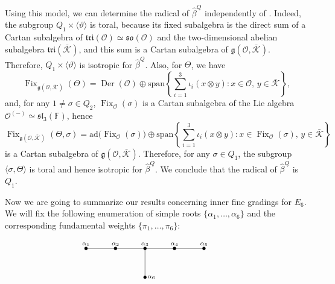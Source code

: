 \documentclass[a4paper,reqno]{amsart}
\theoremstyle{definition}
\numberwithin{theorem}{section}
\numberwithin{equation}{section}
\begin{document}
Using this model, we can determine the radical of $\hat{\beta}^Q$ independently of \cite{DV_E6}. Indeed, the subgroup $Q_1\times\langle\vartheta\rangle$ is toral, because its fixed subalgebra is the direct sum of a Cartan subalgebra of ${\mathfrak{tri}}({\mathcal{O}})\simeq{{\mathfrak{so}}}({\mathcal{O}})$ and the two-dimensional abelian subalgebra ${\mathfrak{tri}}(\bar{\mathcal{K}})$, and this sum is a Cartan subalgebra of ${{\mathfrak g}}({\mathcal{O}},\bar{\mathcal{K}})$. Therefore, $Q_1\times\langle\vartheta\rangle$ is isotropic for $\hat\beta^Q$. Also, for $\Theta$, we have  
\[
\operatorname{\mathrm{Fix}}_{{{\mathfrak g}}({\mathcal{O}},\bar{\mathcal{K}})}(\Theta)=\operatorname{\mathrm{Der}}({\mathcal{O}})\oplus{\mathrm{span}\left\{{\sum_{i=1}^3\iota_i(x\otimes y):  x\in{\mathcal{O}},\,y\in\bar{\mathcal{K}}}\right\}},
\]
and, for any $1\ne \sigma\in Q_2$, $\operatorname{\mathrm{Fix}}_{\mathcal{O}}(\sigma)$ is a Cartan subalgebra of the Lie algebra ${\mathcal{O}}^{(-)}\simeq {{\mathfrak{sl}}}_3({\mathbb{F}})$, hence
\[
\operatorname{\mathrm{Fix}}_{{{\mathfrak g}}({\mathcal{O}},\bar{\mathcal{K}})}(\Theta,\sigma)={\mathrm{ad}}\bigl(\operatorname{\mathrm{Fix}}_{\mathcal{O}}(\sigma)\bigr)\oplus{\mathrm{span}\left\{{\sum_{i=1}^3 \iota_i(x\otimes y): x\in \operatorname{\mathrm{Fix}}_{\mathcal{O}}(\sigma),\,y\in\bar{\mathcal{K}}}\right\}}
\]
is a Cartan subalgebra of ${{\mathfrak g}}({\mathcal{O}},\bar{\mathcal{K}})$. Therefore, for any $\sigma\in Q_1$, the subgroup $\langle\sigma,\Theta\rangle$ is toral and hence isotropic for $\hat\beta^Q$. We conclude that the radical of $\hat\beta^Q$ is $Q_1$.

\medskip

Now we are going to summarize our results concerning inner fine gradings for $E_6$. We will fix the following enumeration of simple roots $\{\alpha_1,\ldots,\alpha_6\}$ and the corresponding fundamental weights $\{{\pi}_1,\ldots,{\pi}_6\}$:

\[
\xymatrix{
\bullet\ar@{-}[]+0;[r]+0^<{\alpha_1}  & \bullet\ar@{-}[]+0;[r]+0^<{\alpha_2} & \bullet\ar@{-}[]+0;[r]+0^<{\alpha_3}\ar@{-}[]+0;[d]+0^>{\alpha_6}  & \bullet\ar@{-}[]+0;[r]+0^<{\alpha_4} & \bullet\ar@{}[]+0;[r]^<{\alpha_5} & \\
& & \bullet & &
}
\]
\end{document}
